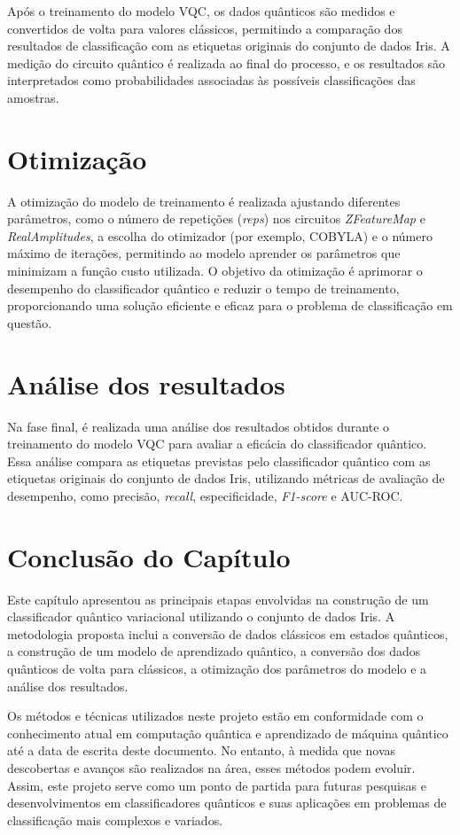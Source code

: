 Após o treinamento do modelo VQC, os dados quânticos são medidos e convertidos de volta para valores clássicos, permitindo a comparação dos resultados de classificação com as etiquetas originais do conjunto de dados Iris. A medição do circuito quântico é realizada ao final do processo, e os resultados são interpretados como probabilidades associadas às possíveis classificações das amostras.

\section{Otimização}

A otimização do modelo de treinamento é realizada ajustando diferentes parâmetros, como o número de repetições (\textit{reps}) nos circuitos \textit{ZFeatureMap} e \textit{RealAmplitudes}, a escolha do otimizador (por exemplo, COBYLA) e o número máximo de iterações, permitindo ao modelo aprender os parâmetros que minimizam a função custo utilizada. O objetivo da otimização é aprimorar o desempenho do classificador quântico e reduzir o tempo de treinamento, proporcionando uma solução eficiente e eficaz para o problema de classificação em questão.

\section{Análise dos resultados}

Na fase final, é realizada uma análise dos resultados obtidos durante o treinamento do modelo VQC para avaliar a eficácia do classificador quântico. Essa análise compara as etiquetas previstas pelo classificador quântico com as etiquetas originais do conjunto de dados Iris, utilizando métricas de avaliação de desempenho, como precisão, \textit{recall}, especificidade, \textit{F1-score} e AUC-ROC.

\section{Conclusão do Capítulo}

Este capítulo apresentou as principais etapas envolvidas na construção de um classificador quântico variacional utilizando o conjunto de dados Iris. A metodologia proposta inclui a conversão de dados clássicos em estados quânticos, a construção de um modelo de aprendizado quântico, a conversão dos dados quânticos de volta para clássicos, a otimização dos parâmetros do modelo e a análise dos resultados.

Os métodos e técnicas utilizados neste projeto estão em conformidade com o conhecimento atual em computação quântica e aprendizado de máquina quântico até a data de escrita deste documento. No entanto, à medida que novas descobertas e avanços são realizados na área, esses métodos podem evoluir. Assim, este projeto serve como um ponto de partida para futuras pesquisas e desenvolvimentos em classificadores quânticos e suas aplicações em problemas de classificação mais complexos e variados.